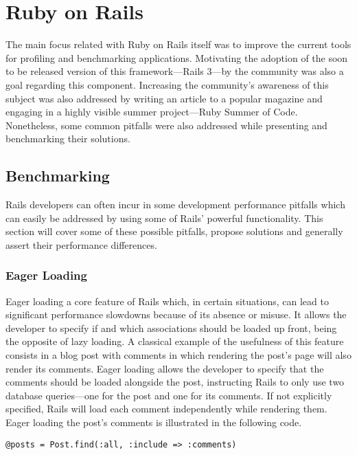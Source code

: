 \section{Ruby on Rails} %
\label{solution:sec:ruby_on_rails}
The main focus related with Ruby on Rails itself was to improve the current tools for profiling and benchmarking applications. Motivating the adoption of the soon to be released version of this framework---Rails 3---by the community was also a goal regarding this component. Increasing the community's awareness of this subject was also addressed by writing an article to a popular magazine and engaging in a highly visible summer project---Ruby Summer of Code. Nonetheless, some common pitfalls were also addressed while presenting and benchmarking their solutions.

\begin{comment}
Create tools to improve Rails

Push the Rails community forward
\end{comment}

\subsection{Benchmarking}
Rails developers can often incur in some development performance pitfalls which can easily be addressed by using some of Rails' powerful functionality. This section will cover some of these possible pitfalls, propose solutions and generally assert their performance differences.


\subsubsection{Eager Loading}
Eager loading a core feature of Rails which, in certain situations, can lead to significant performance slowdowns because of its absence or misuse. It allows the developer to specify if and which associations should be loaded up front, being the opposite of lazy loading. A classical example of the usefulness of this feature consists in a blog post with comments in which rendering the post's page will also render its comments. Eager loading allows the developer to specify that the comments should be loaded alongside the post, instructing Rails to only use two database queries---one for the post and one for its comments. If not explicitly specified, Rails will load each comment independently while rendering them. Eager loading the post's comments is illustrated in the following code.
\begin{lstlisting}[xleftmargin=30pt,xrightmargin=30pt]
@posts = Post.find(:all, :include => :comments)
\end{lstlisting}

